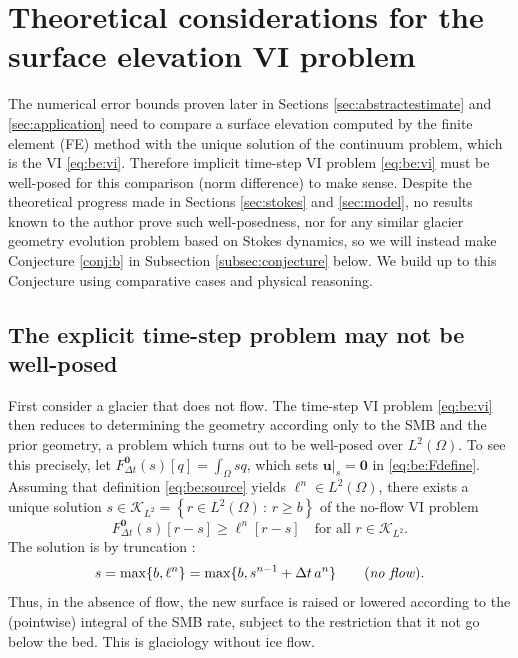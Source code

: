 \documentclass[hidelinks,onefignum,onetabnum,final]{siamart220329}  %
\newcommand{\bu}{\mathbf{u}}
\newcommand{\bzero}{\bm{0}}
\newcommand{\cK}{\mathcal{K}}
\begin{document}
\section{Theoretical considerations for the surface elevation VI problem} \label{sec:theory}

The numerical error bounds proven later in Sections \ref{sec:abstractestimate} and \ref{sec:application} need to compare a surface elevation computed by the finite element (FE) method with the unique solution of the continuum problem, which is the VI \eqref{eq:be:vi}.  Therefore implicit time-step VI problem \eqref{eq:be:vi} must be well-posed for this comparison (norm difference) to make sense.  Despite the theoretical progress made in Sections \ref{sec:stokes} and \ref{sec:model}, no results known to the author prove such well-posedness, nor for any similar glacier geometry evolution problem based on Stokes dynamics, so we will instead make Conjecture \ref{conj:b} in Subsection \ref{subsec:conjecture} below.  We build up to this Conjecture using comparative cases and physical reasoning.

\subsection{The explicit time-step problem may not be well-posed} \label{subsec:explicit}  First consider a glacier that does not flow.  The time-step VI problem \eqref{eq:be:vi} then reduces to determining the geometry according only to the SMB and the prior geometry, a problem which turns out to be well-posed over $L^2(\Omega)$.  To see this precisely, let $F^{\bzero}_{\Delta t}(s)[q] = \int_\Omega sq$, which sets $\bu|_s=\bzero$ in \eqref{eq:be:Fdefine}.  Assuming that definition \eqref{eq:be:source} yields $\ell^n \in L^2(\Omega)$, there exists a unique solution $s \in \cK_{L^2} = \left\{r\in L^2(\Omega)\,:\,r \ge b\right\}$ of the no-flow VI problem
\begin{equation}
F^{\bzero}_{\Delta t}(s)[r-s] \ge \ell^n[r-s] \quad \text{for all } r \in \cK_{L^2}.
\end{equation}
The solution is by truncation \cite[section II.3]{KinderlehrerStampacchia1980}:
\begin{equation}
s = \max\{b, \ell^n\} = \max\{b, s^{n-1} + \Delta t\,a^n\} \qquad (\text{\emph{no flow}}).
\end{equation}
Thus, in the absence of flow, the new surface is raised or lowered according to the (pointwise) integral of the SMB rate, subject to the restriction that it not go below the bed.  This is glaciology without ice flow.
\end{document}
